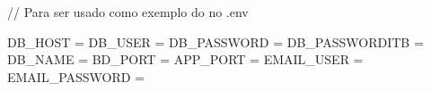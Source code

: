 // Para ser usado como exemplo do no .env 

DB_HOST = 
DB_USER = 
DB_PASSWORD = 
DB_PASSWORDITB = 
DB_NAME = 
BD_PORT = 
APP_PORT = 
EMAIL_USER =
EMAIL_PASSWORD =
